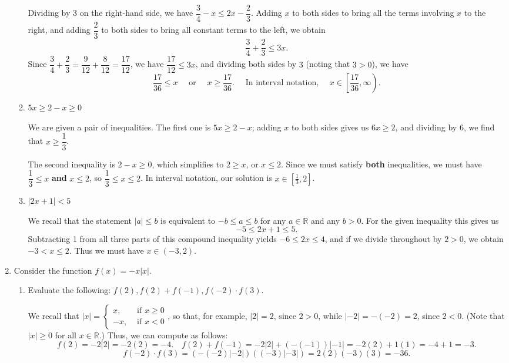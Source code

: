 \documentclass[12pt]{article}
\newcommand{\points}[1]{\marginpar{\hspace{24pt}[#1]}}
\newcommand{\abs}[1]{\lvert #1\rvert}
\begin{document}
\begin{enumerate}
\begin{enumerate}
\bigskip

Dividing by 3 on the right-hand side, we have $\dfrac{3}{4}-x \leq 2x-\dfrac{2}{3}$. Adding $x$ to both sides to bring all the terms involving $x$ to the right, and adding $\dfrac{2}{3}$ to both sides to bring all constant terms to the left, we obtain
\[
 \dfrac{3}{4}+\dfrac{2}{3}\leq 3x.
\]
Since $\dfrac{3}{4}+\dfrac{2}{3} = \dfrac{9}{12}+\dfrac{8}{12} = \dfrac{17}{12}$, we have $\dfrac{17}{12}\leq 3x$, and dividing both sides by $3$ (noting that $3>0$), we have
\[
 \frac{17}{36}\leq x \quad \text{ or } \quad x\geq \frac{17}{36}. \quad \text{ In interval notation, } \quad x\in \left[\frac{17}{36},\infty\right).
\]

\bigskip

 \item $5x\geq 2-x\geq 0$ \points{4}

\bigskip

We are given a pair of inequalities. The first one is $5x\geq 2-x$; adding $x$ to both sides gives us $6x\geq 2$, and dividing by 6, we find that $x\geq \dfrac{1}{3}$.

The second inequality is $2-x\geq 0$, which simplifies to $2\geq x$, or $x\leq 2$. Since we must satisfy {\bf both} inequalities, we must have $\dfrac{1}{3}\leq x$ {\bf and} $x\leq 2$, so $\dfrac{1}{3}\leq x\leq 2$. In interval notation, our solution is $x\in [\frac{1}{3},2]$.

\bigskip

 \item $\lvert 2x+1\rvert <5$ \points{3}

\bigskip

We recall that the statement $\lvert a\rvert \leq b$ is equivalent to $-b\leq a\leq b$ for any $a\in \mathbb{R}$ and any $b>0$. For the given inequality this gives us
\[
 -5\leq 2x+1\leq 5.
\]
Subtracting 1 from all three parts of this compound inequality yields $-6\leq 2x\leq 4$, and if we divide throughout by $2>0$, we obtain $-3< x\leq 2$. Thus we must have
$x\in (-3,2).$
\end{enumerate}
\newpage

\item Consider the function $f(x) = -x\lvert x\rvert$.
\begin{enumerate}
 \item Evaluate the following: $f(2), f(2) + f(-1), f(-2)\cdot f(3)$. \points{3}

\bigskip

We recall that $\lvert x\rvert = \begin{cases} x, & \text{ if } x\geq 0\\ -x, & \text{ if } x<0\end{cases}$, so that, for example, $\lvert 2\rvert = 2$, since $2>0$, while $\lvert -2\rvert = -(-2) = 2$, since $2<0$. (Note that $\lvert x\rvert \geq 0$ for all $x\in\mathbb{R}$.) Thus, we can compute as follows:
\[
 f(2) = -2\abs{2} = -2(2)=-4. \quad f(2)+f(-1) = -2\abs{2}+(-(-1))\abs{-1} = -2(2)+1(1) = -4+1=-3. 
\]
\[
 f(-2)\cdot f(3) = (-(-2)\abs{-2})((-3)\abs{-3}) = 2(2)(-3)(3) = -36.
\]


\end{enumerate}
\end{enumerate}
\end{document}
